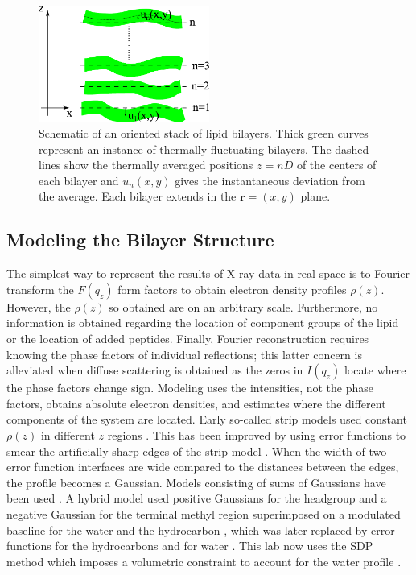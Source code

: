 \begin{figure}[htbp]
  \centering
  \includegraphics[width=0.5\textwidth]{figures/Tat/MMs/stack}
  \caption[Schematic of an oriented stack of lipid bilayers]
  {Schematic of an oriented stack of lipid bilayers. Thick green curves
  represent an instance of thermally fluctuating bilayers. The dashed lines 
  show the thermally averaged positions $z=nD$ of the centers of each bilayer 
  and $u_{n}(x,y)$ gives the instantaneous deviation from the average. 
  Each bilayer extends in the $\mathbf{r}=\left(x,y\right)$ plane.}
  \label{fig:stack}
\end{figure}

\subsection{Modeling the Bilayer Structure}\label{sec:SDP_method}
The simplest way to represent the results of X-ray data in real space is to 
Fourier transform the $F(q_z)$ form factors to obtain electron density profiles 
$\rho(z)$. However, the $\rho(z)$ so obtained are on an arbitrary scale.  
Furthermore, no information is obtained regarding the location of component 
groups of the lipid or the location of added peptides.  
Finally, Fourier reconstruction requires knowing the phase factors of individual 
reflections; this latter concern is alleviated when diffuse scattering is 
obtained as the zeros in $I(q_z)$ locate where the phase factors change sign.  
Modeling uses the intensities, not the phase factors, obtains absolute electron densities, and 
estimates where the different components of the system are located.  
Early so-called strip models used constant $\rho(z)$ in different $z$ regions
\cite{King86}.  
This has been improved by using error functions to smear the artificially sharp 
edges of the strip model \cite{Heinrich14,Shekhar11}. 
When the width of two error function interfaces are wide compared to the distances 
between the edges, the profile becomes a Gaussian.  
Models consisting of sums of Gaussians have been used \cite{Mitsui78}.  
A hybrid model used positive Gaussians for the headgroup and a negative Gaussian 
for the terminal methyl region superimposed on a modulated baseline for the water 
and the hydrocarbon \cite{ref:Wiener89}, which was later replaced by 
error functions for the hydrocarbons and for water \cite{Klauda06}.  
This lab now uses the SDP method which imposes a volumetric constraint to account 
for the water profile \cite{Kucerka08}.  


